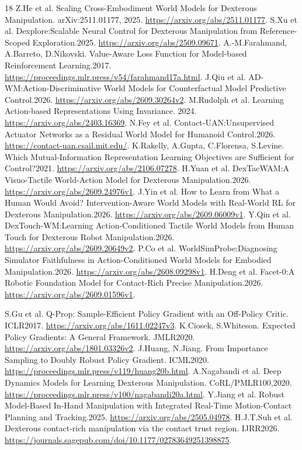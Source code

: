 \documentclass[10 pt]{article}
\begin{document}
\begin{thebibliography}{18}
 Z.He et al. Scaling Cross-Embodiment World Models for Dexterous Manipulation.
arXiv:2511.01177, 2025. \url{https://arxiv.org/abs/2511.01177}.
 S.Xu et al. Dexplore:Scalable Neural Control for Dexterous Manipulation
from Reference-Scoped Exploration.2025. \url{https://arxiv.org/abs/2509.09671}.
 A.-M.Farahmand, A.Barreto, D.Nikovski. Value-Aware Loss Function
for Model-based Reinforcement Learning.2017. \url{https://proceedings.mlr.press/v54/farahmand17a.html}.
 J.Qiu et al. AD-WM:Action-Discriminative World Models for Counterfactual
Model Predictive Control.2026. \url{https://arxiv.org/abs/2609.30264v2}.
 M.Rudolph et al. Learning Action-based Representations Using Invariance.
2024. \url{https://arxiv.org/abs/2403.16369}.
 N.Fey et al. Contact-UAN:Unsupervised Actuator Networks as a Residual
World Model for Humanoid Control.2026. \url{https://contact-uan.csail.mit.edu/}.
 K.Rakelly, A.Gupta, C.Florensa, S.Levine. Which Mutual-Information
Representation Learning Objectives are Sufficient for Control?2021.
\url{https://arxiv.org/abs/2106.07278}.
 H.Yuan et al. DexTacWAM:A Visuo-Tactile World-Action Model for
Dexterous Manipulation.2026. \url{https://arxiv.org/abs/2609.24976v1}.
 J.Yin et al. How to Learn from What a Human Would Avoid?
Intervention-Aware World Models with Real-World RL for Dexterous Manipulation.2026.
\url{https://arxiv.org/abs/2609.06009v1}.
 Y.Qin et al. DexTouch-WM:Learning Action-Conditioned Tactile World
Models from Human Touch for Dexterous Robot Manipulation.2026.
\url{https://arxiv.org/abs/2609.20649v2}.
 P.Co et al. WorldSimProbe:Diagnosing Simulator Faithfulness in
Action-Conditioned World Models for Embodied Manipulation.2026.
\url{https://arxiv.org/abs/2608.09298v1}.
 H.Deng et al. Facet-0:A Robotic Foundation Model for Contact-Rich
Precise Manipulation.2026. \url{https://arxiv.org/abs/2609.01596v1}.

 S.Gu et al. Q-Prop: Sample-Efficient Policy Gradient with an Off-Policy Critic. ICLR2017. \url{https://arxiv.org/abs/1611.02247v3}.
 K.Ciosek, S.Whiteson. Expected Policy Gradients: A General Framework. JMLR2020. \url{https://arxiv.org/abs/1801.03326v2}.
 J.Huang, N.Jiang. From Importance Sampling to Doubly Robust Policy Gradient. ICML2020. \url{https://proceedings.mlr.press/v119/huang20b.html}.
 A.Nagabandi et al. Deep Dynamics Models for Learning Dexterous Manipulation. CoRL/PMLR100,2020. \url{https://proceedings.mlr.press/v100/nagabandi20a.html}.
 Y.Jiang et al. Robust Model-Based In-Hand Manipulation with Integrated Real-Time Motion-Contact Planning and Tracking.2025. \url{https://arxiv.org/abs/2505.04978}.
 H.J.T.Suh et al. Dexterous contact-rich manipulation via the contact trust region. IJRR2026. \url{https://journals.sagepub.com/doi/10.1177/02783649251398875}.
\end{thebibliography}
\end{document}
